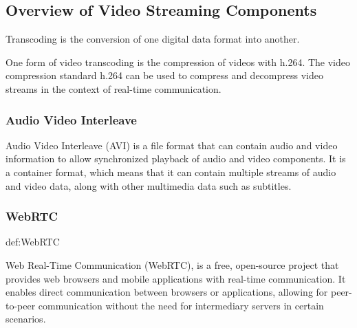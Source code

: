 \documentclass[../MasterThesis.tex]{subfiles}
\begin{document}
\subsection{Overview of Video Streaming Components}
\label{subsection_OverviewVideoStreamingComponents}


Transcoding is the conversion of one digital data format into another.~\cite{transcoding}

One form of video transcoding is the compression of videos with h.264.
The video compression standard h.264 can be used to compress and decompress video streams in the context of real-time communication.~\cite{transcoding}
	




\subsubsection*{Audio Video Interleave} 

Audio Video Interleave (AVI) is a file format that can contain audio and video information to allow synchronized playback of audio and video components. 
It is a container format, which means that it can contain multiple streams of audio and video data, along with other multimedia data such as subtitles.~\cite{avi}







\subsubsection*{WebRTC} 

\begin{CountingDefinition}[WebRTC]{def:WebRTC}
	
	Web Real-Time Communication (WebRTC), is a free, open-source project that provides web browsers and mobile applications with real-time communication. It enables direct communication between browsers or applications, allowing for peer-to-peer communication without the need for intermediary servers in certain scenarios.
	
\end{CountingDefinition}
\end{document}
